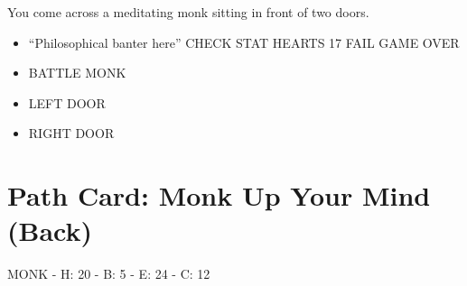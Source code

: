 You come across a meditating monk sitting in front of two doors.

\begin{itemize}
\tightlist
\item
  ``Philosophical banter here'' CHECK STAT HEARTS 17 FAIL GAME OVER
\item
  BATTLE MONK
\item
  LEFT DOOR
\item
  RIGHT DOOR
\end{itemize}

\section{Path Card: Monk Up Your Mind
(Back)}\label{path-card-monk-up-your-mind-back}

MONK - H: 20 - B: 5 - E: 24 - C: 12
